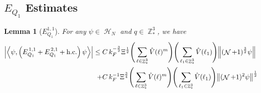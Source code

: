 \documentclass[sn-mathphys, Numbered ,a4paper]{sn-jnl}%
\DeclareMathOperator{\Z}{\mathbb{Z}}
\DeclareMathOperator{\HH}{\mathcal{H}}
\DeclareMathOperator{\NN}{\mathcal{N}}
\newcommand{\half}{\frac{1}{2}}
\newcommand{\eva}[1]{\left\langle #1 \right\rangle}
\theoremstyle{plain}
\newtheorem{lemma}[theorem]{Lemma}
\theoremstyle{definition}
\theoremstyle{remark}
\theoremstyle{plain}
\theoremstyle{definition}
\theoremstyle{remark}
\begin{document}
 \subsection{$E_{Q_1}$ Estimates}
\begin{lemma}[$E_{Q_1}^{1,1}$]
For any $\psi \in \HH_N$ and $q \in \Z^3_*$, we have
\begin{alignat}{2}
     \abs{\eva{\psi,\left(E^{\,1,1}_{Q_1}+E^{\,2,1}_{Q_1}+\mathrm{h.c.}\right) \psi }}\nonumber
     \leq \; &C\,  k_{F}^{-\frac{3}{2}} \Xi^\half \Bigg(\sum\limits_{\ell \in \Z^3_*} \hat{V}(\ell)^m\Bigg)\Bigg( \sum\limits_{\ell_1 \in \Z^3_*} \hat{V}(\ell_1) \Bigg) \norm { (\NN+1)^{\frac{3}{2}} \psi }\\
     \;+ &C\, k_{F}^{-1}\Xi^{\frac{3}{4}} \Bigg(\sum\limits_{\ell \in \Z^3_*} \hat{V}(\ell)^m\Bigg) \Bigg(\sum\limits_{\ell_1 \in \Z^3_*} \hat{V}(\ell_1) \Bigg)  \norm{ (\NN+1)^2\psi}^\half \label{eq:estEQ111}
\end{alignat}
\end{lemma}
\end{document}
